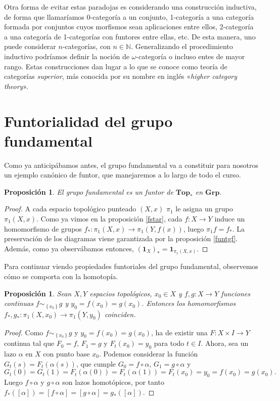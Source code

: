 \documentclass[12pt,a4paper]{book}
\newtheorem{prop}[thm]{Proposición}
\theoremstyle{definition} \newtheorem{defn}[thm]{Definición}
\theoremstyle{definition} \newtheorem{ejemplo}[thm]{Ejemplo}
\theoremstyle{definition} \newtheorem{ejercicio}[thm]{Ejercicio}
\theoremstyle{remark} \newtheorem*{obs}{Observación}
\def\id{\mathbf{1}}
\def\gf{\pi_1}
\def\top{\mathbf{Top}}
\def\grp{\mathbf{Grp}}
\begin{document}
Otra forma de evitar estas paradojas es considerando una construcción inductiva, de forma que llamaríamos 0-categoría a un conjunto, 1-categoría a una categoría formada por conjuntos cuyos morfismos sean aplicaciones entre ellos, 2-categoría a una categoría de 1-categorías con funtores entre ellas, etc. De esta manera, uno puede considerar $n$-categorías, con $n\in \mathbb{N}$. Generalizando el procedimiento inductivo podríamos definir la noción de $\omega$-categoría o incluso entes de mayor rango. Estas construcciones dan lugar a lo que se conoce como teoría de categorías \emph{superior}, más conocida por su nombre en inglés «\emph{higher category theory}».

\section{Funtorialidad del grupo fundamental}

Como ya anticipábamos antes, el grupo fundamental va a constituir para nosotros un ejemplo canónico de funtor, que manejaremos a lo largo de todo el curso.

\begin{prop}
  El grupo fundamental es un funtor de $\top_*$ en $\grp$.
\end{prop}
\begin{proof}
  A cada espacio topológico punteado $(X,x)$ $\gf$ le asigna un grupo $\gf(X,x)$. Como ya vimos en la proposición \ref{fstar}, cada $f:X\rightarrow Y$ induce un homomorfismo de grupos $f_*:\gf(X,x)\rightarrow \gf(Y,f(x))$, luego $\gf f=f_*$. La preservación de los diagramas viene garantizada por la proposición \ref{funtgf}. Además, como ya observábamos entonces, $(\id_X)_*=\id_{\gf(X,x)}$.
\end{proof}

Para continuar viendo propiedades funtoriales del grupo fundamental, observemos cómo se comporta con la homotopía.

\begin{prop}
  Sean $X,Y$ espacios topológicos, $x_0\in X$ y $f,g:X\rightarrow Y$ funciones continuas $f\sim_{\left\{x_0 \right\}}g$ y $y_0=f(x_0)=g(x_0)$. Entonces los homomorfismos $f_*,g_*:\gf(X,x_0)\rightarrow \gf(Y,y_0)$ coinciden.
\end{prop}
\begin{proof}
  Como $f\sim_{\left\{x_0 \right\}}g$ y $y_0=f(x_0)=g(x_0)$, ha de existir una $F:X\times I \rightarrow Y$ continua tal que $F_0=f$, $F_1=g$ y $F_t(x_0)=y_0$ para todo $t \in I$. Ahora, sea un lazo $\alpha$ en $X$ con punto base $x_0$. Podemos considerar la función $G_t(s)=F_t(\alpha(s))$, que cumple $G_0=f\circ \alpha$, $G_1=g \circ \alpha$ y $$G_t(0)=G_t(1)=F_t(\alpha(0))=F_t(\alpha(1))=F_t(x_0)=y_0=f(x_0)=g(x_0).$$ Luego $f\circ \alpha$ y $g \circ \alpha$ son lazos homotópicos, por tanto $f_*([\alpha])=[f\circ \alpha]=[g\circ \alpha]=g_*([\alpha])$.
\end{proof}
\end{document}
